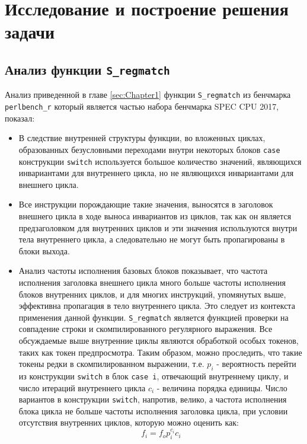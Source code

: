 \chapter{Исследование и построение решения задачи}
\label{sec:Chapter3} 

\section{Анализ функции \texttt{S\_regmatch}}

Анализ приведенной в главе \ref{sec:Chapter1} функции \texttt{S\_regmatch} из бенчмарка \texttt{perlbench\_r} который является частью набора бенчмарка SPEC CPU\textsuperscript{\tiny\textregistered} 2017, показал:
\begin{itemize}
    \item В следствие внутренней структуры функции, во вложенных циклах, образованных безусловными переходами внутри некоторых блоков \texttt{case} конструкции \texttt{switch} используется большое количество значений, являющихся инвариантами для внутреннего цикла, но не являющихся инвариантами для внешнего цикла.
    \item Все инструкции порождающие такие значения, выносятся в заголовок внешнего цикла в ходе выноса инвариантов из циклов, так как он является предзаголовком для внутренних циклов и эти значения используются внутри тела внутреннего цикла, а следовательно не могут быть пропагированы в блоки выхода.
    \item Анализ частоты исполнения базовых блоков показывает, что частота исполнения заголовка внешнего цикла много больше частоты исполнения блоков внутренних циклов, и для многих инструкций, упомянутых выше, эффективна пропагация в тело внутреннего цикла.
        Это следует из контекста применения данной функции.
        \texttt{S\_regmatch} является функцией проверки на совпадение строки и скомпилированного регулярного выражения.
        Все обсуждаемые выше внутренние циклы являются обработкой особых токенов, таких как токен предпросмотра.
        Таким образом, можно проследить, что такие токены редки в скомпилированном выражении, т.е. $p_i$ - вероятность перейти из конструкции \texttt{switch} в блок \texttt{case i}, отвечающий внутреннему циклу, и число итераций внутреннего цикла $c_i$ - величина порядка единицы.
        Число вариантов в конструкции \texttt{switch}, напротив, велико, а частота исполнения блока цикла не больше частоты исполнения заголовка цикла, при условии отсутствия внутренних циклов, которую можно оценить как:
        $$ f_i = f_o  p_i^{c_i}  c_i $$

\end{itemize}
